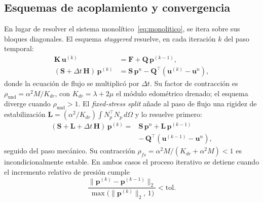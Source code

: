 \documentclass[twocolumn, a4paper]{article}
\begin{document}
    \subsection{Esquemas de acoplamiento y convergencia}
    \quad En lugar de resolver el sistema monolítico~\eqref{eq:monolitico}, se itera
    sobre sus bloques diagonales. El esquema \textit{staggered} resuelve, en cada
    iteración $k$ del paso temporal:
    \begin{align}
    \bm{K}\,\bm{u}^{(k)} &= \bm{F}+\bm{Q}\,\bm{p}^{(k-1)}, \\
    (\bm{S}+\Delta t\,\bm{H})\,\bm{p}^{(k)} &= \bm{S}\,\bm{p}^{n}-\bm{Q}^{\!\top}(\bm{u}^{(k)}-\bm{u}^{n}),
    \end{align}
    donde la ecuación de flujo se multiplicó por $\Delta t$. Su factor de
    contracción es $\rho_{\text{und}}=\alpha^2 M/K_{dr}$, con $K_{dr}=\lambda+2\mu$
    el módulo edométrico drenado; el esquema diverge cuando $\rho_{\text{und}}>1$.
    El \textit{fixed-stress split} \cite{mikelic2013} añade al paso de flujo una
    rigidez de estabilización $\bm{L}=(\alpha^2/K_{dr})\!\int\!N_p^{\top}N_p\,d\Omega$
    y lo resuelve primero:
    \begin{equation}
    \begin{aligned}
    (\bm{S}+\bm{L}+\Delta t\,\bm{H})\,\bm{p}^{(k)} ={}& \bm{S}\,\bm{p}^{n}+\bm{L}\,\bm{p}^{(k-1)} \\
    &-\,\bm{Q}^{\!\top}(\bm{u}^{(k-1)}-\bm{u}^{n}),
    \end{aligned}
    \end{equation}
    seguido del paso mecánico. Su contracción
    $\rho_{fs}=\alpha^2 M/(K_{dr}+\alpha^2 M)<1$ es incondicionalmente estable. En
    ambos casos el proceso iterativo se detiene cuando el incremento relativo de
    presión cumple
    \begin{equation}
    \frac{\lVert \bm{p}^{(k)}-\bm{p}^{(k-1)}\rVert_2}{\max\!\big(\lVert \bm{p}^{(k)}\rVert_2,\,1\big)} < \text{tol}.
    \end{equation}
\end{document}
